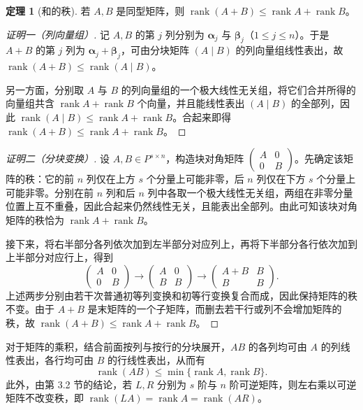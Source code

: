 \documentclass[UTF8, fontset=fandol, a4paper, 12pt]{ctexart}
\newcommand{\rank}{\operatorname{rank}}
\theoremstyle{definition}
\newtheorem{theorem}[definition]{定理}
\begin{document}
\begin{theorem}[和的秩]
若 $A,B$ 是同型矩阵，则 $\rank(A+B)\le\rank A+\rank B$。
\end{theorem}
\begin{proof}[证明一（列向量组）]
记 $A,B$ 的第 $j$ 列分别为 $\boldsymbol{\alpha}_j$ 与 $\boldsymbol{\beta}_j$（$1\le j\le n$）。于是 $A+B$ 的第 $j$ 列为 $\boldsymbol{\alpha}_j+\boldsymbol{\beta}_j$，可由分块矩阵 $(A\mid B)$ 的列向量组线性表出，故 $\rank(A+B)\le\rank(A\mid B)$。

另一方面，分别取 $A$ 与 $B$ 的列向量组的一个极大线性无关组，将它们合并所得的向量组共含 $\rank A+\rank B$ 个向量，并且能线性表出 $(A\mid B)$ 的全部列，因此 $\rank(A\mid B)\le\rank A+\rank B$。合起来即得 $\rank(A+B)\le\rank A+\rank B$。
\end{proof}
\begin{proof}[证明二（分块变换）]
设 $A,B\in P^{s\times n}$，构造块对角矩阵 $\begin{pmatrix}A&0\\0&B\end{pmatrix}$。先确定该矩阵的秩：它的前 $n$ 列仅在上方 $s$ 个分量上可能非零，后 $n$ 列仅在下方 $s$ 个分量上可能非零。分别在前 $n$ 列和后 $n$ 列中各取一个极大线性无关组，两组在非零分量位置上互不重叠，因此合起来仍然线性无关，且能表出全部列。由此可知该块对角矩阵的秩恰为 $\rank A+\rank B$。

接下来，将右半部分各列依次加到左半部分对应列上，再将下半部分各行依次加到上半部分对应行上，得到
\[
 \begin{pmatrix}A&0\\0&B\end{pmatrix}
 \longrightarrow
 \begin{pmatrix}A&0\\B&B\end{pmatrix}
 \longrightarrow
 \begin{pmatrix}A+B&B\\B&B\end{pmatrix}.
\]
上述两步分别由若干次普通初等列变换和初等行变换复合而成，因此保持矩阵的秩不变。由于 $A+B$ 是末矩阵的一个子矩阵，而删去若干行或列不会增加矩阵的秩，故 $\rank(A+B)\le\rank A+\rank B$。
\end{proof}

对于矩阵的乘积，结合前面按列与按行的分块展开，$AB$ 的各列均可由 $A$ 的列线性表出，各行均可由 $B$ 的行线性表出，从而有
\[
 \rank(AB)\le\min\{\rank A,\rank B\}.
\]
此外，由第 3.2 节的结论，若 $L,R$ 分别为 $s$ 阶与 $n$ 阶可逆矩阵，则左右乘以可逆矩阵不改变秩，即 $\rank(LA)=\rank A=\rank(AR)$。
\end{document}
